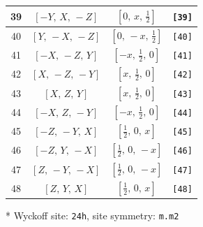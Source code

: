 \documentclass[fleqn,8pt]{jsarticle}
\begin{document}
\begin{longtable}{cccc}
39 & $\left[ - Y,\, X,\, - Z \right]$ & $\left[ 0,\, x,\, \frac{1}{2} \right]$ & {\tt [39]} \\ \hline
40 & $\left[ Y,\, - X,\, - Z \right]$ & $\left[ 0,\, - x,\, \frac{1}{2} \right]$ & {\tt [40]} \\ \hline
41 & $\left[ - X,\, - Z,\, Y \right]$ & $\left[ - x,\, \frac{1}{2},\, 0 \right]$ & {\tt [41]} \\ \hline
42 & $\left[ X,\, - Z,\, - Y \right]$ & $\left[ x,\, \frac{1}{2},\, 0 \right]$ & {\tt [42]} \\ \hline
43 & $\left[ X,\, Z,\, Y \right]$ & $\left[ x,\, \frac{1}{2},\, 0 \right]$ & {\tt [43]} \\ \hline
44 & $\left[ - X,\, Z,\, - Y \right]$ & $\left[ - x,\, \frac{1}{2},\, 0 \right]$ & {\tt [44]} \\ \hline
45 & $\left[ - Z,\, - Y,\, X \right]$ & $\left[ \frac{1}{2},\, 0,\, x \right]$ & {\tt [45]} \\ \hline
46 & $\left[ - Z,\, Y,\, - X \right]$ & $\left[ \frac{1}{2},\, 0,\, - x \right]$ & {\tt [46]} \\ \hline
47 & $\left[ Z,\, - Y,\, - X \right]$ & $\left[ \frac{1}{2},\, 0,\, - x \right]$ & {\tt [47]} \\ \hline
48 & $\left[ Z,\, Y,\, X \right]$ & $\left[ \frac{1}{2},\, 0,\, x \right]$ & {\tt [48]} \\
\end{longtable}
* Wyckoff site: {\tt 24h}, site symmetry: {\tt m.m2}
\renewcommand{\arraystretch}{1.2}
\end{document}
